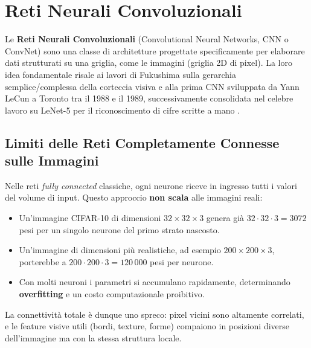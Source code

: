\chapter{Reti Neurali Convoluzionali}
\label{ch:cnn}

Le \textbf{Reti Neurali Convoluzionali} (Convolutional Neural Networks, CNN o ConvNet) sono
una classe di architetture progettate specificamente per elaborare dati strutturati su una
griglia, come le immagini (griglia 2D di pixel). La loro idea fondamentale risale ai lavori di
Fukushima sulla gerarchia semplice/complessa della corteccia visiva e alla prima CNN sviluppata
da Yann LeCun a Toronto tra il 1988 e il 1989, successivamente consolidata nel celebre lavoro
su LeNet-5 per il riconoscimento di cifre scritte a mano \citep{bishop2024}.

\section{Limiti delle Reti Completamente Connesse sulle Immagini}
\label{sec:fc-limits}

Nelle reti \emph{fully connected} classiche, ogni neurone riceve in ingresso tutti i valori del
volume di input. Questo approccio \textbf{non scala} alle immagini reali:

\begin{itemize}
  \item Un'immagine CIFAR-10 di dimensioni $32 \times 32 \times 3$ genera già
        $32 \cdot 32 \cdot 3 = 3072$ pesi per un singolo neurone del primo strato nascosto.
  \item Un'immagine di dimensioni più realistiche, ad esempio $200 \times 200 \times 3$,
        porterebbe a $200 \cdot 200 \cdot 3 = 120\,000$ pesi per neurone.
  \item Con molti neuroni i parametri si accumulano rapidamente, determinando
        \textbf{overfitting} e un costo computazionale proibitivo.
\end{itemize}

La connettività totale è dunque uno spreco: pixel vicini sono altamente correlati, e le feature
visive utili (bordi, texture, forme) compaiono in posizioni diverse dell'immagine ma con la
stessa struttura locale.

